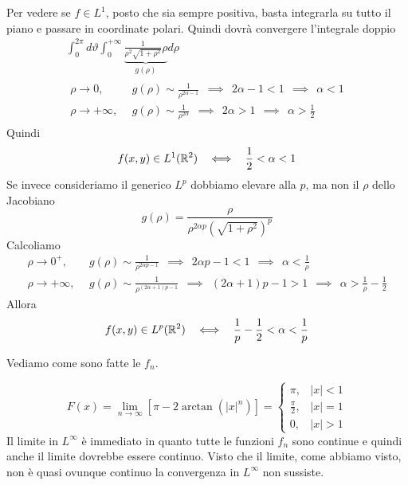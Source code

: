 Per vedere se $f\in L^{1}$, posto che sia sempre positiva, basta integrarla su tutto il piano e passare in coordinate polari. Quindi dovrà convergere l'integrale doppio
\begin{gather*}
\int ^{2\pi }_{0} d\vartheta \int ^{+\infty }_{0}\underbrace{\frac{1}{\rho ^{2}\sqrt{1+\rho ^{2}}} \rho }_{g( \rho )} d\rho \\
\begin{aligned}
\rho \rightarrow 0, & \ \ g(\rho )\sim \frac{1}{\rho ^{2\alpha -1}} \ \ \implies \ \ 2\alpha -1< 1\ \ \implies \ \ \alpha < 1\\
\rho \rightarrow +\infty , & \ \ g(\rho )\sim \frac{1}{\rho ^{2\alpha }} \ \ \implies \ \ 2\alpha  >1\ \ \implies \ \ \alpha  >\frac{1}{2}
\end{aligned}
\end{gather*}
Quindi
\begin{equation*}
f(x,y)\in L^{1} (\RR ^{2} )\ \ \iff \ \ \frac{1}{2} < \alpha < 1
\end{equation*}
Se invece consideriamo il generico $L^{p}$ dobbiamo elevare alla $p$, ma non il $\rho $ dello Jacobiano
\begin{equation*}
g(\rho )=\frac{\rho }{\rho ^{2\alpha p}\left(\sqrt{1+\rho ^{2}}\right)^{p}}
\end{equation*}
Calcoliamo
\begin{equation*}
\begin{aligned}
\rho \rightarrow 0^{+} , & \ \ g(\rho )\sim \frac{1}{\rho ^{2\alpha p-1}} \ \ \implies \ \ 2\alpha p-1< 1\ \ \implies \ \ \alpha < \frac{1}{\rho }\\
\rho \rightarrow +\infty , & \ \ g(\rho )\sim \frac{1}{\rho ^{(2\alpha +1)p-1}} \ \ \implies \ \ (2\alpha +1)p-1 >1\ \ \implies \ \ \alpha  >\frac{1}{\rho } -\frac{1}{2}
\end{aligned}
\end{equation*}
Allora
\begin{equation*}
f(x,y)\in L^{p} (\RR ^{2} )\ \ \iff \ \ \frac{1}{p} -\frac{1}{2} < \alpha < \frac{1}{p}
\end{equation*}
\Soluzione

Vediamo come sono fatte le $f_{n}$.

\begin{equation*}
F(x)=\lim _{n\rightarrow \infty }\left[ \pi -2\arctan (|x|^{n} )\right] =\begin{cases}
\pi , & |x|< 1\\
\frac{\pi }{2} , & |x|=1\\
0, & |x| >1
\end{cases}
\end{equation*}
Il limite in $L^{\infty }$ è immediato in quanto tutte le funzioni $f_{n}$ sono continue e quindi anche il limite dovrebbe essere continuo. Visto che il limite, come abbiamo visto, non è quasi ovunque continuo la convergenza in $L^{\infty }$ non sussiste.

